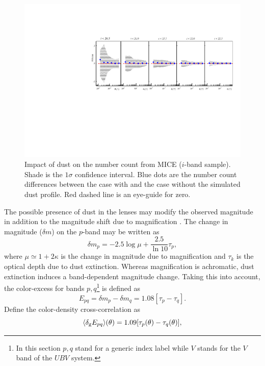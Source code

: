 \begin{figure}
\includegraphics[width=\textwidth,trim={0 2.3cm 0 3.5cm},clip]{./figures/mag_idust.pdf}
\caption{Impact of dust on the number count from MICE ($i$-band sample). Shade is the $1\sigma$ confidence interval. Blue dots are the number count differences between the case with and the case without the simulated dust profile. Red dashed line is an eye-guide for zero.}
\label{fig:micedust}
\end{figure}
The possible presence of dust in the lenses may modify the observed magnitude in addition to the magnitude shift due to magnification \cite{2010MNRAS.405.1025M}. The change in magnitude ($\delta m$) on the $p$-band may be written as
\begin{equation}
\delta m_p = -2.5\log\mu+\frac{2.5}{\ln10}\tau_p,
\end{equation}
where  $\mu\simeq1+2\kappa$ is the change in magnitude due to magnification and $\tau_k$ is the optical depth due to dust extinction. Whereas magnification is achromatic, dust extinction induces a band-dependent magnitude change. Taking this into account, the color-excess for bands $p,q$\footnote{In this section $p,q$ stand for a generic index label while $V$ stands for the $V$ band of the $UBV$ system.} is defined as
\begin{equation}
E_{pq} = \delta m_p-\delta m_q=1.08[\tau_p-\tau_q].
\end{equation}
Define the color-density cross-correlation as \cite{2010MNRAS.405.1025M}
\begin{equation}
\langle \delta_{\rm g}E_{pq}\rangle(\theta) = 1.09[\tau_p(\theta)-\tau_q(\theta)],
\end{equation}
